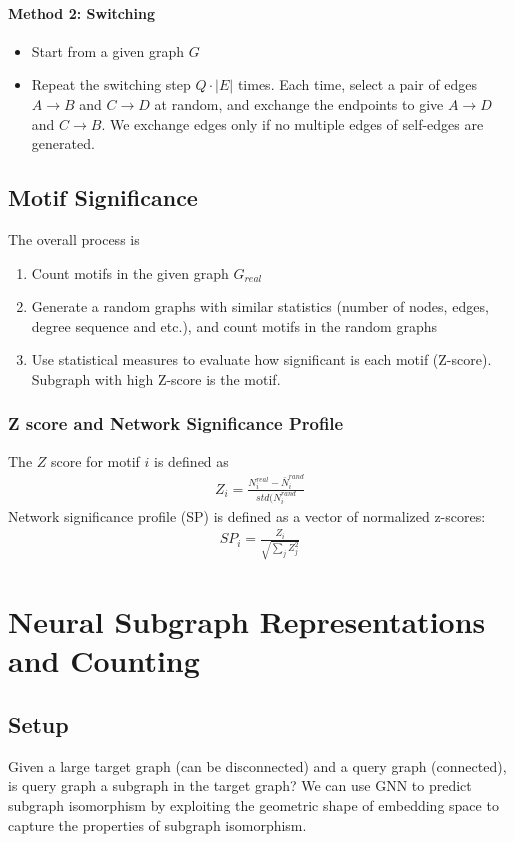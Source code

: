 \paragraph{Method 2: Switching } 
    \begin{itemize}
        \item Start from a given graph $G$
        \item Repeat the switching step $Q \cdot |E|$ times. Each time, select a pair of edges $A\to B$ and $C \to D$ at random, and exchange the endpoints to give $A \to D$ and $C \to B$. We exchange edges only if no multiple edges of self-edges are generated. 
    \end{itemize}

\subsection{Motif Significance} 
The overall process is 
    \begin{enumerate}
        \item Count motifs in the given graph $G_{real}$
        \item Generate a random graphs with similar statistics (number of nodes, edges, degree sequence and etc.), and count motifs in the random graphs 
        \item Use statistical measures to evaluate how significant is each motif (Z-score). Subgraph with high Z-score is the motif. 
    \end{enumerate}

\subsubsection{Z score and Network Significance Profile}
The $Z$ score for motif $i$ is defined as 
    \begin{align*}
        Z_i = \frac{N_i^{real} - \bar{N}_i^{rand}}{std(N_i^{rand}}
    \end{align*}
Network significance profile (SP) is defined as a vector of normalized z-scores: 
    \begin{align*}
        SP_i = \frac{Z_i}{\sqrt{\sum_j Z_j^2}}
    \end{align*}

\section{Neural Subgraph Representations and Counting} 

\subsection{Setup}
Given a large target graph (can be disconnected) and a query graph (connected), is query graph a subgraph in the target graph? We can use GNN to predict subgraph isomorphism by exploiting the geometric shape of embedding space to capture the properties of subgraph isomorphism. \\\par

